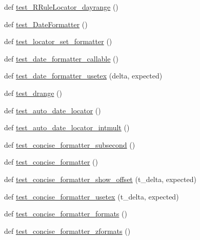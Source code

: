 \begin{DoxyCompactItemize}
\item 
def \hyperlink{namespacematplotlib_1_1tests_1_1test__dates_ae9e7b99baabb83d20a4c7111c8f36aa1}{test\+\_\+\+R\+Rule\+Locator\+\_\+dayrange} ()
\item 
def \hyperlink{namespacematplotlib_1_1tests_1_1test__dates_a20c10bf1c5850754813d85a0fdd229d3}{test\+\_\+\+Date\+Formatter} ()
\item 
def \hyperlink{namespacematplotlib_1_1tests_1_1test__dates_a17e0bbfdd69fccce54b990d71564c086}{test\+\_\+locator\+\_\+set\+\_\+formatter} ()
\item 
def \hyperlink{namespacematplotlib_1_1tests_1_1test__dates_a19a204cc9404962fb27597eb9f1d4320}{test\+\_\+date\+\_\+formatter\+\_\+callable} ()
\item 
def \hyperlink{namespacematplotlib_1_1tests_1_1test__dates_af4e277ee8726695a95ec93fa73516637}{test\+\_\+date\+\_\+formatter\+\_\+usetex} (delta, expected)
\item 
def \hyperlink{namespacematplotlib_1_1tests_1_1test__dates_acd05632b4bdefe00fac1aba7c54fd874}{test\+\_\+drange} ()
\item 
def \hyperlink{namespacematplotlib_1_1tests_1_1test__dates_a001a37c2214457e732d414f00bc22013}{test\+\_\+auto\+\_\+date\+\_\+locator} ()
\item 
def \hyperlink{namespacematplotlib_1_1tests_1_1test__dates_af834cc146e9214842d24587df2408680}{test\+\_\+auto\+\_\+date\+\_\+locator\+\_\+intmult} ()
\item 
def \hyperlink{namespacematplotlib_1_1tests_1_1test__dates_a3ce55a488fae77e9414f668a18b896ba}{test\+\_\+concise\+\_\+formatter\+\_\+subsecond} ()
\item 
def \hyperlink{namespacematplotlib_1_1tests_1_1test__dates_a6b1ab2f43cd5754c206309bf3d272a06}{test\+\_\+concise\+\_\+formatter} ()
\item 
def \hyperlink{namespacematplotlib_1_1tests_1_1test__dates_ab797d31bcb063c31481025e7d91b6d7e}{test\+\_\+concise\+\_\+formatter\+\_\+show\+\_\+offset} (t\+\_\+delta, expected)
\item 
def \hyperlink{namespacematplotlib_1_1tests_1_1test__dates_a2622c59a42af056a4c97c123d24a1741}{test\+\_\+concise\+\_\+formatter\+\_\+usetex} (t\+\_\+delta, expected)
\item 
def \hyperlink{namespacematplotlib_1_1tests_1_1test__dates_a887047fb8c773b9267181e1c056dc204}{test\+\_\+concise\+\_\+formatter\+\_\+formats} ()
\item 
def \hyperlink{namespacematplotlib_1_1tests_1_1test__dates_a3ce7a79a192e79649ee123202d57e304}{test\+\_\+concise\+\_\+formatter\+\_\+zformats} ()

\end{DoxyCompactItemize}
